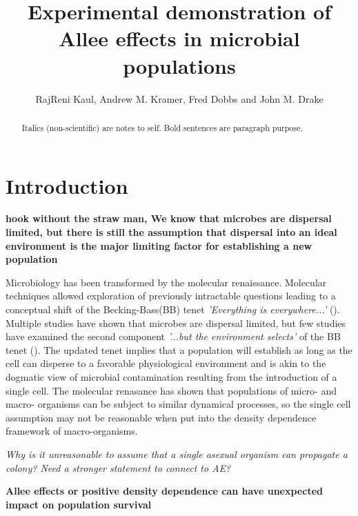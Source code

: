 \documentclass[a4paper,10pt]{article}\usepackage[]{graphicx}\usepackage[]{color}
\title{Experimental demonstration of Allee effects in microbial populations}
\author{RajReni Kaul, Andrew M. Kramer, Fred Dobbs and John M. Drake}
\begin{document}
\maketitle

\begin{abstract}
Italics (non-scientific) are notes to self. Bold sentences are paragraph purpose. 
\end{abstract}

\section{Introduction}
\textbf{hook without the straw man, We know that microbes are dispersal limited, but there is still the assumption that dispersal into an ideal environment is the major limiting factor for establishing a new population}

Microbiology has been transformed by the molecular renaissance. Molecular techniques allowed exploration of previously intractable questions leading to a conceptual shift of the Becking-Bass(BB) tenet \textit{'Everything is everywhere...'} (\cite{baas_becking_geobiologie_1934, de_wit_everything_2006}). Multiple studies have shown that microbes are dispersal limited, but few studies have examined the second component \textit{'...but the environment selects'} of the BB tenet (\cite{sul_marine_2013, reno_biogeography_2009, hellweger_biogeographic_2014}). The updated tenet implies that a population will establish as long as the cell can disperse to a favorable physiological environment and is akin to the dogmatic view of microbial contamination resulting from the introduction of a single cell.  The molecular renasance has shown that populations of micro- and macro- organisms can be subject to similar dynamical processes, so the single cell assumption may not be reasonable when put into the density dependence framework of macro-organisms.

\textit{Why is it unreasonable to assume that a single asexual organism can propagate a colony? Need a stronger statement to connect to AE?}

\textbf{Allee effects or positive density dependence can have unexpected impact on population survival}
\end{document}
